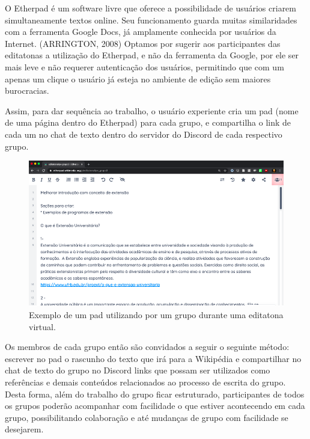 O Etherpad é um software livre que oferece a possibilidade de usuários criarem simultaneamente textos online. Seu funcionamento guarda muitas similaridades com a ferramenta Google Docs, já amplamente conhecida por usuários da Internet. (ARRINGTON, 2008) Optamos por sugerir aos participantes das editatonas a utilização do Etherpad, e não da ferramenta da Google, por ele ser mais leve e não requerer autenticação dos usuários, permitindo que com um apenas um clique o usuário já esteja no ambiente de edição sem maiores burocracias.

Assim, para dar sequência ao trabalho, o usuário experiente cria um pad (nome de uma página dentro do Etherpad) para cada grupo, e compartilha o link de cada um no chat de texto dentro do servidor do Discord de cada respectivo grupo.

\begin{figure}[H]
    \centering
    \includegraphics[width=1\textwidth]{Images/etherpad.png}
    \caption{Exemplo de um pad utilizando por um grupo durante uma editatona virtual.}
    \label{fig:etherpad}
\end{figure}

Os membros de cada grupo então são convidados a seguir o seguinte método: escrever no pad o rascunho do texto que irá para a Wikipédia e compartilhar no chat de texto do grupo no Discord links que possam ser utilizados como referências e demais conteúdos relacionados ao processo de escrita do grupo. Desta forma, além do trabalho do grupo ficar estruturado, participantes de todos os grupos poderão acompanhar com facilidade o que estiver acontecendo em cada grupo, possibilitando colaboração e até mudanças de grupo com facilidade se desejarem.

